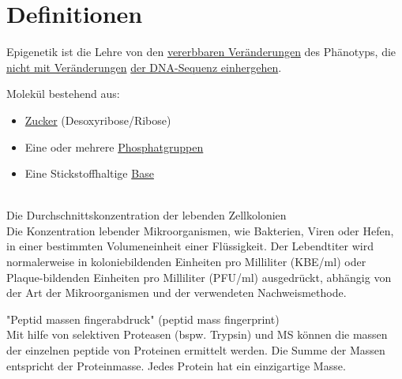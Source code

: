 
 
\section{Definitionen}

Epigenetik ist die Lehre von den \underline{vererbbaren Veränderungen} des Phänotyps, die \underline{nicht mit Veränderungen} \underline{der DNA-Sequenz einhergehen}. \\ \newline 

Molekül bestehend aus: 
\begin{itemize}
    \item \underline{Zucker} (Desoxyribose/Ribose)
    \item Eine oder mehrere \underline{Phosphatgruppen}
    \item Eine Stickstoffhaltige \underline{Base}
\end{itemize}$\ $ \\

Die Durchschnittskonzentration der lebenden Zellkolonien \\
Die Konzentration lebender Mikroorganismen, wie Bakterien, Viren oder Hefen, in einer bestimmten Volumeneinheit einer Flüssigkeit. Der Lebendtiter wird normalerweise in koloniebildenden Einheiten pro Milliliter (KBE/ml) oder Plaque-bildenden Einheiten pro Milliliter (PFU/ml) ausgedrückt, abhängig von der Art der Mikroorganismen und der verwendeten Nachweismethode.  \\ \newline

"Peptid massen fingerabdruck" (peptid mass fingerprint) \\
Mit hilfe von selektiven Proteasen (bspw. \gls{Trypsin}) und MS können die massen der einzelnen peptide von Proteinen ermittelt werden. Die Summe der Massen entspricht der Proteinmasse. Jedes Protein hat ein einzigartige Masse. \\ \newline

